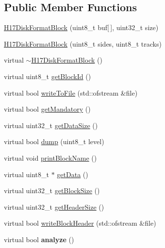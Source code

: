 \subsection*{Public Member Functions}
\begin{DoxyCompactItemize}
\item 
\hyperlink{classH17DiskFormatBlock_a4a1efec9e012dbf3bfd6ed13f1bcd237}{H17\+Disk\+Format\+Block} (uint8\+\_\+t buf\mbox{[}$\,$\mbox{]}, uint32\+\_\+t size)
\item 
\hyperlink{classH17DiskFormatBlock_a8402886a5ae98187049377ece6f2bdcc}{H17\+Disk\+Format\+Block} (uint8\+\_\+t sides, uint8\+\_\+t tracks)
\item 
virtual \hyperlink{classH17DiskFormatBlock_a4ef228b0bbbdea345504c0fdc5b56072}{$\sim$\+H17\+Disk\+Format\+Block} ()
\item 
virtual uint8\+\_\+t \hyperlink{classH17DiskFormatBlock_aac958f000c2a3cef00ef7f12699ae0d8}{get\+Block\+Id} ()
\item 
virtual bool \hyperlink{classH17DiskFormatBlock_af49df48b3a9626b2dab1731fd366ee8f}{write\+To\+File} (std\+::ofstream \&file)
\item 
virtual bool \hyperlink{classH17DiskFormatBlock_a369c003e9e3cb73d103edfcee7f9f847}{get\+Mandatory} ()
\item 
virtual uint32\+\_\+t \hyperlink{classH17DiskFormatBlock_aac397509c1ce80ed4d41caee0caf6c56}{get\+Data\+Size} ()
\item 
virtual bool \hyperlink{classH17DiskFormatBlock_a055968ac29519bdfc82ef37e35d45fd6}{dump} (uint8\+\_\+t level)
\item 
virtual void \hyperlink{classH17DiskFormatBlock_a0a0ea5025af3abdbb7fdd962e5d3df4a}{print\+Block\+Name} ()
\item 
virtual uint8\+\_\+t $\ast$ \hyperlink{classH17Block_a6c2432cccdacdfb1a335bd924f19d942}{get\+Data} ()
\item 
virtual uint32\+\_\+t \hyperlink{classH17Block_a0327b6359cdf502269bbb7c6f35fae18}{get\+Block\+Size} ()
\item 
virtual uint32\+\_\+t \hyperlink{classH17Block_ad71ae203afc8713d4ee7416757fadbbe}{get\+Header\+Size} ()
\item 
virtual bool \hyperlink{classH17Block_a5c4d56a6c991c87fb9215797ce63b804}{write\+Block\+Header} (std\+::ofstream \&file)
\item 
\hypertarget{classH17Block_ae53600d945ed3ffac13d3a769a1e1ab2}{}virtual bool {\bfseries analyze} ()\label{classH17Block_ae53600d945ed3ffac13d3a769a1e1ab2}

\end{DoxyCompactItemize}
